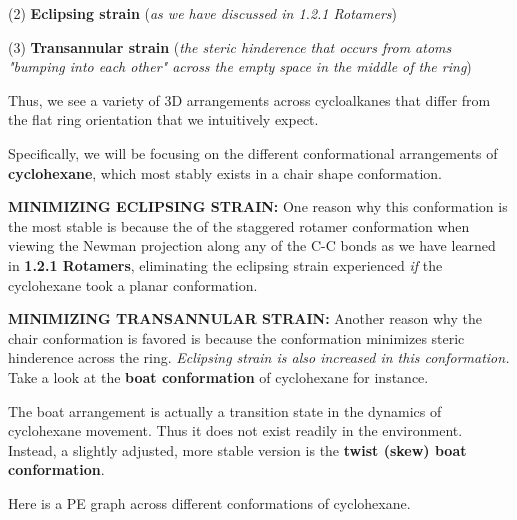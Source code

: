 \documentclass[10pt]{article}
\begin{document}
  (2) \textbf{Eclipsing strain} (\textit{as we have discussed in 1.2.1 Rotamers})

  (3) \textbf{Transannular strain} (\textit{the steric hinderence that occurs from atoms "bumping into each other" across the empty space in the middle of the ring})


  Thus, we see a variety of 3D arrangements across cycloalkanes that differ from the flat ring orientation that we intuitively expect.


  Specifically, we will be focusing on the different conformational arrangements of \textbf{cyclohexane}, which most stably exists in a chair shape conformation. 


  \textbf{MINIMIZING ECLIPSING STRAIN:} One reason why this conformation is the most stable is because the of the staggered rotamer conformation when viewing the Newman projection along any of the C-C bonds as we have learned in \textbf{1.2.1 Rotamers}, eliminating the eclipsing strain experienced \textit{if} the cyclohexane took a planar conformation.


  \textbf{MINIMIZING TRANSANNULAR STRAIN:} Another reason why the chair conformation is favored is because the conformation minimizes steric hinderence across the ring. \textit{Eclipsing strain is also increased in this conformation.} Take a look at the \textbf{boat conformation} of cyclohexane for instance.


  The boat arrangement is actually a transition state in the dynamics of cyclohexane movement. Thus it does not exist readily in the environment. Instead, a slightly adjusted, more stable version is the \textbf{twist (skew) boat conformation}.


  Here is a PE graph across different conformations of cyclohexane.
\end{document}
